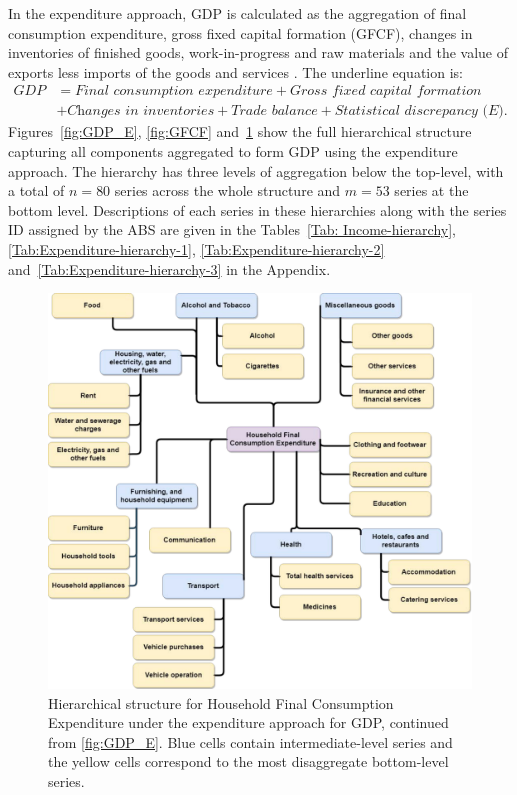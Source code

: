 \documentclass[graybox]{svmult}
\begin{document}
In the expenditure approach, GDP is calculated as the aggregation of final consumption expenditure, gross fixed capital formation (GFCF), changes in inventories of finished goods, work-in-progress and raw materials and the value of exports less imports of the goods and services \citep{ABS2015}. The underline equation is:
\begin{align*}
	\textit{GDP}
	 & = \textit{Final consumption expenditure}
     + \textit{Gross fixed capital formation} \\
	 & + \textit{Changes in inventories}
     + \textit{Trade balance}
     + \textit{Statistical discrepancy (E)}.
\end{align*}
Figures~\ref{fig:GDP_E}, \ref{fig:GFCF} and~\ref{fig:HFCE} show the full hierarchical structure capturing all components aggregated to form GDP using the expenditure approach. The hierarchy has three levels of aggregation below the top-level, with a total of $n=80$ series across the whole structure and $m=53$ series at the bottom level. Descriptions of each series in these hierarchies along with the series ID assigned by the ABS are given in the Tables~\ref{Tab: Income-hierarchy}, \ref{Tab:Expenditure-hierarchy-1}, \ref{Tab:Expenditure-hierarchy-2} and~\ref{Tab:Expenditure-hierarchy-3} in the Appendix.

\begin{figure}[!t]
	\centering
	\includegraphics[width=.9\textwidth]{Figs/Hierarchical-structures/HFCE.pdf}
	\caption{Hierarchical structure for Household Final Consumption Expenditure under the expenditure approach for GDP, continued from \autoref{fig:GDP_E}. Blue cells contain intermediate-level series and the yellow cells correspond to the most disaggregate bottom-level series.}\label{fig:HFCE}
\end{figure}
\end{document}

